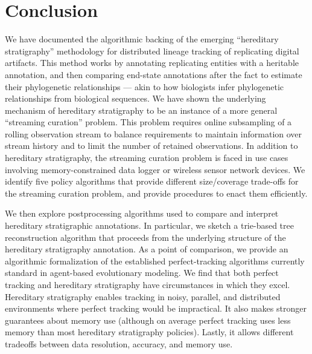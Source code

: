 \section{Conclusion} \label{sec:conclusion}

We have documented the algorithmic backing of the emerging ``hereditary stratigraphy'' methodology for distributed lineage tracking of replicating digital artifacts.
This method works by annotating replicating entities with a heritable annotation, and then comparing end-state annotations after the fact to estimate their phylogenetic relationships --- akin to how biologists infer phylogenetic relationships from biological sequences.
We have shown the underlying mechanism of hereditary stratigraphy to be an instance of a more general ``streaming curation'' problem.
This problem requires online subsampling of a rolling observation stream to balance requirements to maintain information over stream history and to limit the number of retained observations.
In addition to hereditary stratigraphy, the streaming curation problem is faced in use cases involving memory-constrained data logger or wireless sensor network devices.
We identify five policy algorithms that provide different size/coverage trade-offs for the streaming curation problem, and provide procedures to enact them efficiently.

We then explore postprocessing algorithms used to compare and interpret hereditary stratigraphic annotations.
In particular, we sketch a trie-based tree reconstruction algorithm that proceeds from the underlying structure of the hereditary stratigraphy annotation.
As a point of comparison, we provide an algorithmic formalization of the established perfect-tracking algorithms currently standard in agent-based evolutionary modeling.
We find that both perfect tracking and hereditary stratigraphy have circumstances in which they excel.
Hereditary stratigraphy enables tracking in noisy, parallel, and distributed environments where perfect tracking would be impractical.
It also makes stronger guarantees about memory use (although on average perfect tracking uses less memory than most hereditary stratigraphy policies).
Lastly, it allows different tradeoffs between data resolution, accuracy, and memory use.

